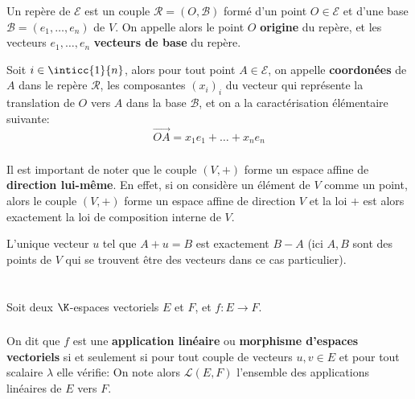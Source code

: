 \subsection*{}
Un repère de \(\mathscr{E}\) est un couple \(\mathscr{R} = (O, \mathscr{B})\) formé d'un point \(O \in \mathscr{E}\) et d'une base \(\mathscr{B} = (e_1, \ldots, e_n)\) de \(V\). On appelle alors le point \(O\) \textbf{origine} du repère, et les vecteurs \(e_1, \ldots, e_n\) \textbf{vecteurs de base} du repère.\<

Soit \(i\in\inticc{1}{n}\), alors pour tout point \(A \in \mathscr{E}\), on appelle \textbf{coordonées} de \(A\) dans le repère \(\mathscr{R}\), les composantes \((x_i)_i\) du vecteur qui représente la translation de \(O\) vers \(A\) dans la base \(\mathscr{B}\), et on a la caractérisation élémentaire suivante:
\[
   \overrightarrow{OA} = x_1e_1 + \ldots + x_ne_n 
\]

\subsection*{}
Il est important de noter que le couple \((V, +)\) forme un espace affine de \textbf{direction lui-même}. En effet, si on considère un élément de \(V\) comme un point, alors le couple  \((V, +)\) forme un espace affine de direction \(V\) et la loi \(+\) est alors exactement la loi de composition interne de \(V\).\<

L'unique vecteur \(u\) tel que \(A + u = B\) est exactement \(B - A\) (ici \(A, B\) sont des points de \(V\) qui se trouvent être des vecteurs dans ce cas particulier).
\chapter*{} %

Soit deux \(\K\)-espaces vectoriels \(E\) et \(F\), et \(f : E \longrightarrow F \).

\subsection*{}

On dit que \(f\) est une \textbf{application linéaire} ou \textbf{morphisme d'espaces vectoriels} si et seulement si pour tout couple de vecteurs \(u, v \in E\) et pour tout scalaire \(\lambda\) elle vérifie: 
On note alors \(\mathcal{L}(E, F)\) l'ensemble des applications linéaires de \(E\) vers \(F\).\<

